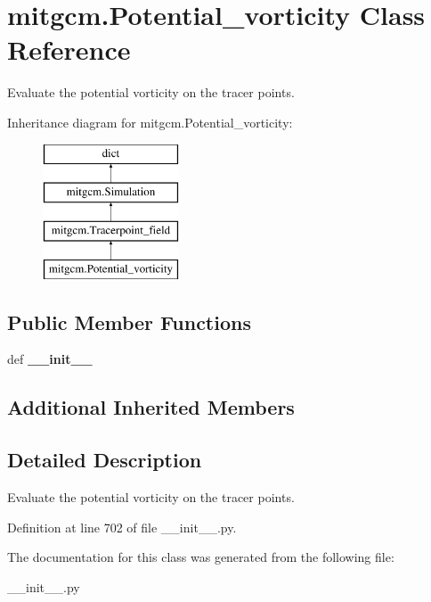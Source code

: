\hypertarget{classmitgcm_1_1Potential__vorticity}{\section{mitgcm.\+Potential\+\_\+vorticity Class Reference}
\label{classmitgcm_1_1Potential__vorticity}
}


Evaluate the potential vorticity on the tracer points.  


Inheritance diagram for mitgcm.\+Potential\+\_\+vorticity\+:\begin{figure}[H]
\begin{center}
\leavevmode
\includegraphics[height=4.000000cm]{classmitgcm_1_1Potential__vorticity}
\end{center}
\end{figure}
\subsection*{Public Member Functions}
\begin{DoxyCompactItemize}
\item 
\hypertarget{classmitgcm_1_1Potential__vorticity_a5412ecfe6e02d7a6953cf8c2a7dab4cb}{def {\bfseries \+\_\+\+\_\+init\+\_\+\+\_\+}}\label{classmitgcm_1_1Potential__vorticity_a5412ecfe6e02d7a6953cf8c2a7dab4cb}

\end{DoxyCompactItemize}
\subsection*{Additional Inherited Members}


\subsection{Detailed Description}
Evaluate the potential vorticity on the tracer points. 



Definition at line 702 of file \+\_\+\+\_\+init\+\_\+\+\_\+.\+py.



The documentation for this class was generated from the following file\+:\begin{DoxyCompactItemize}
\item 
\+\_\+\+\_\+init\+\_\+\+\_\+.\+py\end{DoxyCompactItemize}
